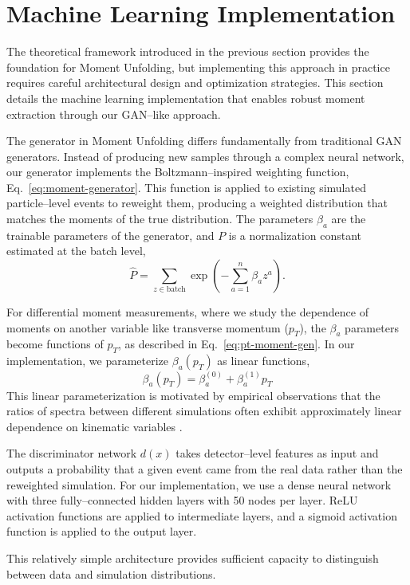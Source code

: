 \section{Machine Learning Implementation}
    The theoretical framework introduced in the previous section provides the foundation for Moment Unfolding, but implementing this approach in practice requires careful architectural design and optimization strategies.
    This section details the machine learning implementation that enables robust moment extraction through our GAN--like approach.

    The generator in Moment Unfolding differs fundamentally from traditional GAN generators.
    Instead of producing new samples through a complex neural network, our generator implements the Boltzmann--inspired weighting function, Eq.~\ref{eq:moment-generator}.
    This function is applied to existing simulated particle--level events to reweight them, producing a weighted distribution that matches the moments of the true distribution.
    The parameters $\beta_a$ are the trainable parameters of the generator, and $P$ is a normalization constant estimated at the batch level,
    \[
        \hat P = \sum_{z \in \text{batch}} \exp\left(-\sum_{a=1}^n\beta_a z^a\right).
    \]

    For differential moment measurements, where we study the dependence of moments on another variable like transverse momentum ($p_T$), the $\beta_a$ parameters become functions of $p_T$, as described in Eq.~\ref{eq:pt-moment-gen}.
    In our implementation, we parameterize $\beta_a(p_T)$ as linear functions, 
    \[
        \beta_a(p_T) = \beta_a^{(0)} + \beta_a^{(1)}p_T
    \]
    This linear parameterization is motivated by empirical observations that the ratios of spectra between different simulations often exhibit approximately linear dependence on kinematic variables .

    The discriminator network $d(x)$ takes detector--level features as input and outputs a probability that a given event came from the real data rather than the reweighted simulation.
    For our implementation, we use a dense neural network with three fully--connected hidden layers with 50 nodes per layer.
    ReLU activation functions are applied to intermediate layers, and a sigmoid activation function is applied to the output layer.

    This relatively simple architecture provides sufficient capacity to distinguish between data and simulation distributions.

